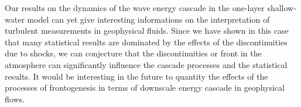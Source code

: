 \documentclass{jfm}
\begin{document}


Our results on the dynamics of the wave energy cascade in the
one-layer shallow-water model can yet give interesting informations on
the interpretation of turbulent measurements in geophysical fluids.
%
Since we have shown in this case that many statistical results are
dominated by the effects of the discontinuities due to shocks, we can
conjecture that the discontinuities or front in the atmosphere can
significantly influence the cascade processes and the statistical
results.
%
It would be interesting in the future to quantity the effects of the
processes of frontogenesis in terms of downscale energy cascade in
geophysical flows.
\end{document}

